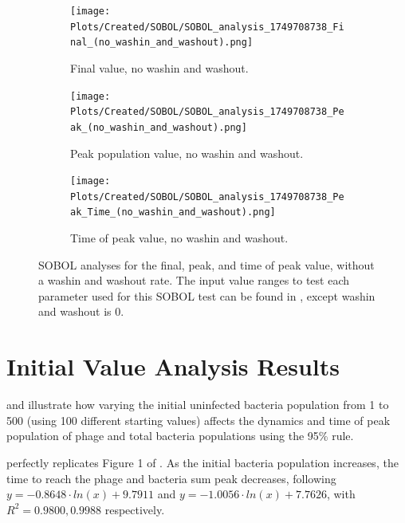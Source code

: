 \begin{figure}[ht!]
    \centering
    \begin{subfigure}{0.32\linewidth}
        \centering
        \captionsetup{width=1\linewidth}
        \texttt{[image: Plots/Created/SOBOL/SOBOL\_analysis\_1749708738\_Final\_(no\_washin\_and\_washout).png]}
        \caption{
            Final value, no washin and washout. 
        }
        \label{fig:created:SOBOL_final_no_wi_wo}
    \end{subfigure}
    \hfill
    \begin{subfigure}{0.32\linewidth}
        \centering
        \captionsetup{width=1\linewidth}
        \texttt{[image: Plots/Created/SOBOL/SOBOL\_analysis\_1749708738\_Peak\_(no\_washin\_and\_washout).png]}
        \caption{
            Peak population value, no washin and washout. 
        }
        \label{fig:created:SOBOL_peak_no_wi_wo}
    \end{subfigure}
    \hfill
    \begin{subfigure}{0.32\linewidth}
        \centering
        \captionsetup{width=1\linewidth}
        \texttt{[image: Plots/Created/SOBOL/SOBOL\_analysis\_1749708738\_Peak\_Time\_(no\_washin\_and\_washout).png]}
        \caption{
            Time of peak value, no washin and washout. 
        }
        \label{fig:created:SOBOL_peak_time_no_wi_wo}
    \end{subfigure}
    \caption{
        SOBOL analyses for the final, peak, and time of peak value, without a washin and washout rate.
        The input value ranges to test each parameter used for this SOBOL test can be found in , except washin and washout is 0. 
    }
    \label{fig:created:SOBOL_no_wi_wo}
\end{figure}

\section{Initial Value Analysis Results}
\label{sec:results:initial_value_analysis}

 and  illustrate how varying the initial uninfected bacteria population from 1 to 500 (using 100 different starting values) affects the dynamics and time of peak population of phage and total bacteria populations using the 95\% rule. 

 perfectly replicates Figure 1 of \citet{mullaExtremeDiversityPhage2024}. 
As the initial bacteria population increases, the time to reach the phage and bacteria sum peak decreases, following $y = -0.8648\cdot ln(x) + 9.7911$ and $y = -1.0056\cdot ln(x)+7.7626$, with $R^2=0.9800, 0.9988$ respectively. 

